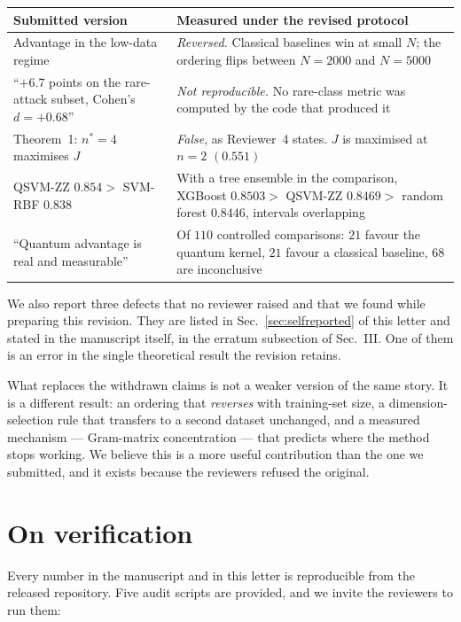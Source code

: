 \documentclass[11pt,a4paper]{article}
\begin{document}
\begin{center}
\small
\begin{tabular}{@{}p{7.3cm}p{8.3cm}@{}}
\toprule
\textbf{Submitted version} & \textbf{Measured under the revised protocol} \\
\midrule
Advantage in the low-data regime &
  \emph{Reversed.} Classical baselines win at small $N$; the ordering flips
  between $N=2000$ and $N=5000$ \\
``$+6.7$ points on the rare-attack subset, Cohen's $d=+0.68$'' &
  \emph{Not reproducible.} No rare-class metric was computed by the code that
  produced it \\
Theorem~1: $n^{\ast}=4$ maximises $J$ &
  \emph{False}, as Reviewer~4 states. $J$ is maximised at $n=2$ $(0.551)$ \\
QSVM-ZZ $0.854 >$ SVM-RBF $0.838$ &
  With a tree ensemble in the comparison, XGBoost $0.8503 >$ QSVM-ZZ $0.8469 >$
  random forest $0.8446$, intervals overlapping \\
``Quantum advantage is real and measurable'' &
  Of $110$ controlled comparisons: $21$ favour the quantum kernel, $21$ favour a
  classical baseline, $68$ are inconclusive \\
\bottomrule
\end{tabular}
\end{center}

\vspace{4pt}
We also report three defects that no reviewer raised and that we found while
preparing this revision. They are listed in Sec.~\ref{sec:selfreported} of this
letter and stated in the manuscript itself, in the erratum subsection of
Sec.~III. One of them is an error in the single theoretical result the revision
retains.

What replaces the withdrawn claims is not a weaker version of the same story. It
is a different result: an ordering that \emph{reverses} with training-set size,
a dimension-selection rule that transfers to a second dataset unchanged, and a
measured mechanism --- Gram-matrix concentration --- that predicts where the
method stops working. We believe this is a more useful contribution than the one
we submitted, and it exists because the reviewers refused the original.

\section*{On verification}

Every number in the manuscript and in this letter is reproducible from the
released repository. Five audit scripts are provided, and we invite the
reviewers to run them:
\end{document}
